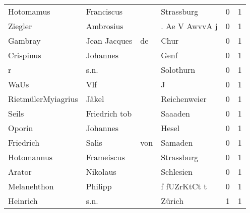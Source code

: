 \begin{center}
\begin{tiny}
\begin{longtabu}{llllrr}
                Hotomamus &                         Franciscus &             &                                  Strassburg &          0 &         1 \\
                  Ziegler &                          Ambrosius &             &                              . Ae V AwvvA j &          0 &         1 \\
                  Gambray &                       Jean Jacques &          de &                                        Chur &          0 &         1 \\
                Crispinus &                           Johannes &             &                                        Genf &          0 &         1 \\
                        r &                               s.n. &             &                                   Solothurn &          0 &         1 \\
                     WaUs &                                Vlf &             &                                           J &          0 &         1 \\
       RietmülerMyiagrius &                              Jäkel &             &                                Reichenweier &          0 &         1 \\
                    Seils &                      Friedrich tob &             &                                     Saaaden &          0 &         1 \\
                   Oporin &                           Johannes &             &                                       Hesel &          0 &         1 \\
                Friedrich &                              Salis &         von &                                     Samaden &          0 &         1 \\
               Hotomannus &                         Frameiscus &             &                                  Strassburg &          0 &         1 \\
                   Arator &                           Nikolaus &             &                                   Schlesien &          0 &         1 \\
              Melanehthon &                            Philipp &             &                                f fUZrKtCt t &          0 &         1 \\
                 Heinrich &                               s.n. &             &                                      Zürich &          1 &         1 \\

\end{longtabu}
\end{tiny}
\end{center}
